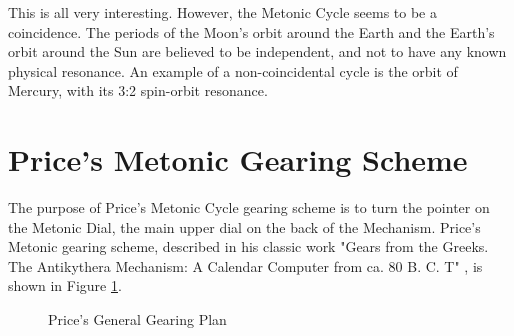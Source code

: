 \documentclass[11pt, oneside]{article}   	%
\theoremstyle{definition}
\begin{document}
\bigskip
\bigskip
\noindent
This is all very interesting. However, the Metonic Cycle seems to be a coincidence. The periods of the Moon's orbit around the Earth and the Earth's 
orbit around the Sun are believed to be independent, and not to have any known physical resonance. An example of a non-coincidental 
cycle is the orbit of Mercury, with its 3:2 spin-orbit resonance.

\section{Price's Metonic Gearing Scheme}
The purpose of Price's  Metonic Cycle gearing scheme is to turn the pointer on the Metonic Dial, the main upper dial on the back of the Mechanism.
Price's Metonic gearing scheme, described in his classic work "Gears from the Greeks. The Antikythera Mechanism: A Calendar Computer from ca. 80 B. C. T" \cite{gears_from_the_greeks}, 
is shown in Figure \ref{fig:general_gearing_plan}. 

\bigskip
\begin{figure}[H]
\caption{Price's General Gearing Plan \cite{gears_from_the_greeks}}
\label{fig:general_gearing_plan}
\end{figure}
\end{document}
